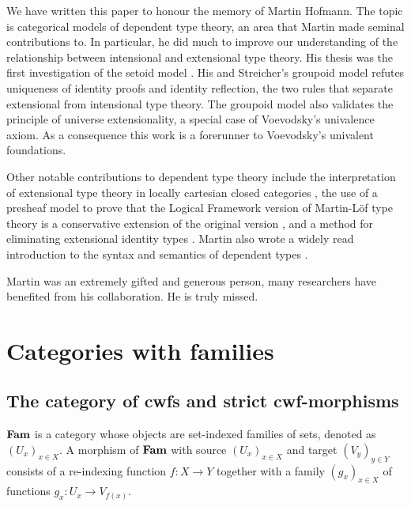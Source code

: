 \documentclass{lmcs}
\def\Cwf{\mathbf{CwF}}
\begin{document}
We have written this paper to honour the memory of Martin Hofmann. The topic is categorical models of dependent type theory, an area that Martin made seminal contributions to. In particular, he did much to improve our understanding of  the relationship between intensional and extensional type theory.
His thesis was the first investigation of the setoid model \cite{hofmann:phd}. His and Streicher's groupoid model \cite{hofmann:groupoid} refutes uniqueness of identity proofs and identity reflection, the two rules that separate extensional from intensional type theory. The groupoid model also validates the principle of universe extensionality, a special case of Voevodsky's univalence axiom. As a consequence this work is a forerunner to Voevodsky's univalent foundations. 

Other notable contributions to dependent type theory include the interpretation of extensional type theory in locally cartesian closed categories \cite{hofmann:csl,curien-garner-hofmann}, the use of a presheaf model to prove that the Logical Framework version of Martin-Löf type theory is a conservative extension of the original version \cite{hofmann:cambridge}, and a method for eliminating extensional identity types \cite{hofmann:conservativity}. Martin also wrote a widely read introduction to the syntax and semantics of dependent types \cite{hofmann:cambridge}. 

Martin was an extremely gifted and generous person,
many researchers have benefited from his collaboration.
He is truly missed.

\section{Categories with families}\label{sec:def_cwf}

\subsection{The category of cwfs and strict cwf-morphisms}


\begin{definition}\label{def:catFam}
$\textbf{Fam}$ is a category whose objects are
set-indexed families of sets, denoted as $(U_x)_{x\in X}$.
A morphism of $\textbf{Fam}$ with source $(U_x)_{x\in X}$ and target $(V_y)_{y\in Y}$
consists of a re-indexing function $f: X\to Y$ together with a family
$(g_x)_{x\in X}$ of functions $g_x : U_x \to V_{f(x)}$. %
\end{definition}
\end{document}
